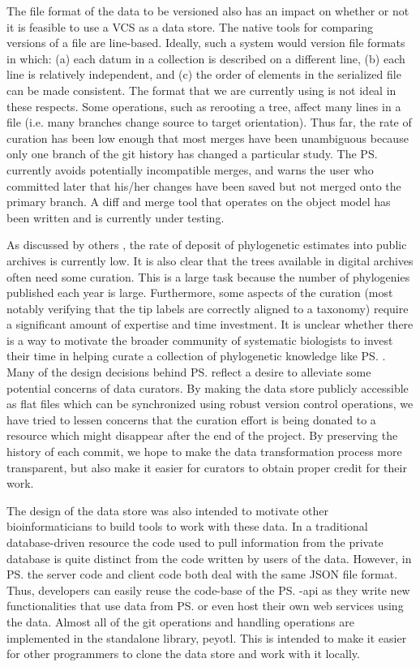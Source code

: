 The file format of the data to be versioned also has an impact on whether or not it is feasible
    to use a VCS as a data store.
The native tools for comparing versions of a file are line-based.
Ideally, such a system would version file formats in which:
    (a) each datum in a collection is described on a different line, 
    (b) each line is relatively independent, and 
    (c) the order of elements in the serialized file can be made consistent.
The \nexson format that we are currently using is not ideal in these respects.
Some operations, such as rerooting a tree,
    affect many lines in a file (i.e. many branches change source to target orientation).
Thus far, the rate of curation has been low enough that most merges have been unambiguous because
    only one branch of the git history has changed a particular study.
The \ps currently avoids potentially incompatible merges, and warns the user who committed later that his/her
    changes have been saved but not merged onto the primary branch.
A diff and merge tool that operates on the object model has been
    written and is currently under testing.

As discussed by others \citep{DrewEtAl2013,MageeMM2014}, the rate of deposit of phylogenetic
    estimates into public archives is currently low.
It is also clear that the trees available in digital archives often need some curation.
This is a large task because the number of phylogenies published each year is large.
Furthermore, some aspects of the curation (most notably verifying that the tip labels are correctly
    aligned to a taxonomy) require a significant amount of expertise and time investment.
It is unclear whether there is a way to motivate the broader community of systematic biologists to
    invest their time in helping curate a collection of phylogenetic knowledge like \ps.
Many of the design decisions behind \ps reflect a desire to alleviate some potential concerns
    of data curators.
By making the data store publicly accessible as flat files which can be synchronized using robust
    version control operations, we have tried to lessen
    concerns that the curation effort is being donated to a resource which might disappear
    after the end of the \otol project.
By preserving the history of each commit, we hope to make the data transformation process more 
    transparent, but also make it easier for curators to obtain proper credit for their work.

The design of the data store was also intended to motivate other bioinformaticians to
    build tools to work with these data.
In a traditional database-driven resource the code used to pull information from the private
    database is quite distinct from the code written by users of the data.
However, in \ps the server code and client code both deal with the same JSON file format.
Thus, developers can easily reuse the code-base of the \ps-api as they write new functionalities
    that use data from \ps or even host their own web services using the data.
Almost all of the git operations and \nexson handling operations are implemented in the standalone
    library, peyotl.
This is intended to make it easier for other programmers to clone
    the data store and work with it locally.

